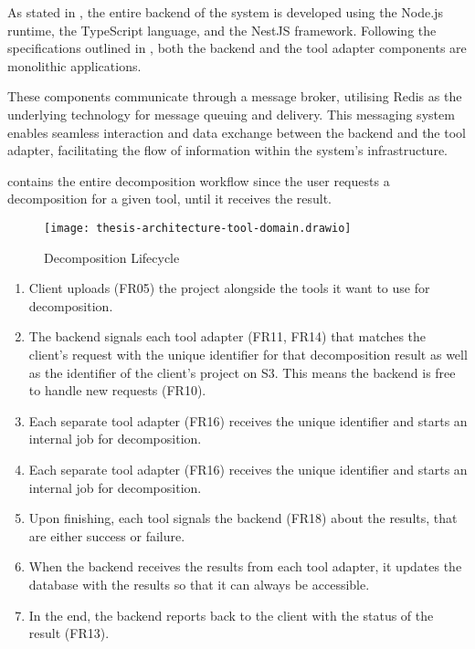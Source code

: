 As stated in , the entire backend of the system is
developed using the Node.js runtime, the TypeScript language, and the NestJS
framework. Following the specifications outlined in ,
both the backend and the tool adapter components are monolithic applications.

These components communicate through a message broker, utilising Redis as the
underlying technology for message queuing and delivery. This messaging system
enables seamless interaction and data exchange between the backend and the tool
adapter, facilitating the flow of information within the system's
infrastructure.

 contains the entire decomposition workflow
since the user requests a decomposition for a given tool, until it receives the
result.

\begin{figure*}[!htb]
  \caption{Decomposition Lifecycle}
  \label{fig:decomposition_lifecycle}
  \centering
  \texttt{[image: thesis-architecture-tool-domain.drawio]}
\end{figure*}

\begin{enumerate}
  \item Client uploads (FR05) the project alongside the tools it want to use
    for decomposition.
  \item The backend signals each tool adapter (FR11, FR14) that matches the
    client's request with the unique identifier for that decomposition result
    as well as the identifier of the client's project on S3. This means the
    backend is free to handle new requests (FR10).
  \item Each separate tool adapter (FR16) receives the unique identifier and
    starts an internal job for decomposition.
  \item Each separate tool adapter (FR16) receives the unique identifier and
    starts an internal job for decomposition.
  \item Upon finishing, each tool signals the backend (FR18) about the results,
    that are either success or failure.
  \item When the backend receives the results from each tool adapter, it
    updates the database with the results so that it can always be accessible.
  \item In the end, the backend reports back to the client with the status of
    the result (FR13).
\end{enumerate}
